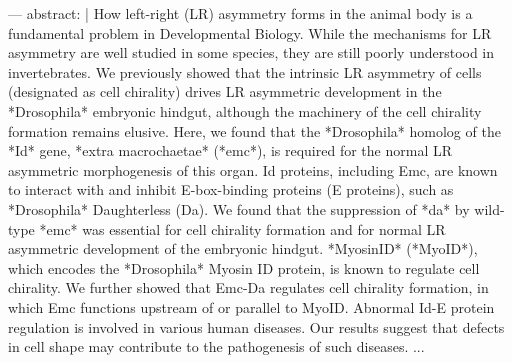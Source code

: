 ---
abstract: |
    How left-right (LR) asymmetry forms in the animal body is a fundamental problem in Developmental Biology.
    While the mechanisms for LR asymmetry are well studied in some species, they are still poorly understood in invertebrates.
    We previously showed that the intrinsic LR asymmetry of cells (designated as cell chirality) drives LR asymmetric development in the *Drosophila* embryonic hindgut, although the machinery of the cell chirality formation remains elusive.
    Here, we found that the *Drosophila* homolog of the *Id* gene, *extra macrochaetae* (*emc*), is required for the normal LR asymmetric morphogenesis of this organ.
    Id proteins, including Emc, are known to interact with and inhibit E-box-binding proteins (E proteins), such as *Drosophila* Daughterless (Da).
    We found that the suppression of *da* by wild-type *emc* was essential for cell chirality formation and for normal LR asymmetric development of the embryonic hindgut.
    *MyosinID* (*MyoID*), which encodes the *Drosophila* Myosin ID protein, is known to regulate cell chirality.
    We further showed that Emc-Da regulates cell chirality formation, in which Emc functions upstream of or parallel to MyoID.
    Abnormal Id-E protein regulation is involved in various human diseases.
    Our results suggest that defects in cell shape may contribute to the pathogenesis of such diseases.
...

